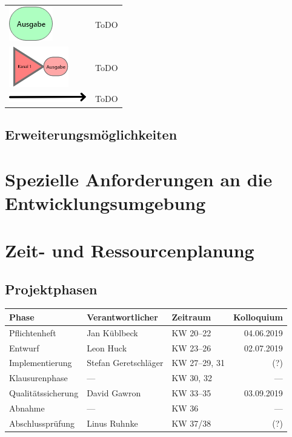 \documentclass[parskip=full]{scrartcl}
\begin{document}
\begin{tabular}[t]{p{1cm} p{10cm}}
	\vspace{0cm}\includegraphics[width = 1 cm]{Grafik/Ausgabe-Transformation.png} & ToDO\\
	\vspace{0cm}\includegraphics[width = 1 cm]{Grafik/Kanal.png} & ToDO\\
	\vspace{0cm}\includegraphics[width = 1 cm]{Grafik/Verbindungspfeil.png} & ToDO\\
\end{tabular}

\subsection{Erweiterungsmöglichkeiten}

\section{Spezielle Anforderungen an die Entwicklungsumgebung}\label{entwicklungsumgebung}

\section{Zeit- und Ressourcenplanung}\label{zeit}

\subsection{Projektphasen}

\begin{tabular}{| l | l | l | r |}
	\hline
	\textbf{Phase} & \textbf{Verantwortlicher} & \textbf{Zeitraum} & \textbf{Kolloquium} \\ \hline
	Pflichtenheft & Jan Küblbeck & KW 20–22 & 04.06.2019 \\
	Entwurf & Leon Huck & KW 23–26 & 02.07.2019 \\
	Implementierung & Stefan Geretschläger & KW 27–29, 31 & (?) \\
	Klausurenphase & — & KW 30, 32 & — \\
	Qualitätssicherung & David Gawron & KW 33–35 & 03.09.2019 \\
	Abnahme & — & KW 36 & — \\
	Abschlussprüfung & Linus Ruhnke & KW 37/38 & (?) \\
	\hline
\end{tabular}
\end{document}
